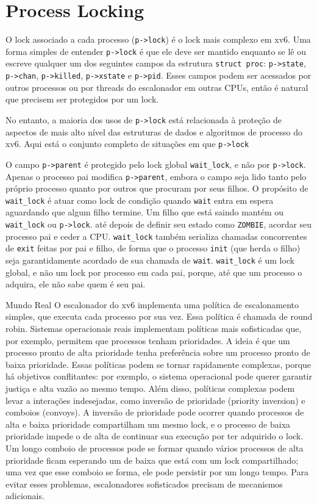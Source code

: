 {\section{Process Locking}
O lock associado a cada processo (\lstinline{p->lock}) é o
lock mais complexo em xv6.
Uma forma simples de entender \lstinline{p->lock} é
que ele deve ser mantido enquanto se lê ou escreve qualquer
um dos seguintes campos da estrutura \lstinline{struct proc}:
\lstinline{p->state},
\lstinline{p->chan},
\lstinline{p->killed},
\lstinline{p->xstate}
e
\lstinline{p->pid}.
Esses campos podem ser acessados por outros processos ou por
threads do escalonador em outras CPUs, então é natural
que precisem ser protegidos por um lock.

No entanto, a maioria dos usos de \lstinline{p->lock} está relacionada
à proteção de aspectos de mais alto nível das estruturas de dados
e algoritmos de processo do xv6. Aqui está o conjunto completo
de situações em que \lstinline{p->lock}

O campo \lstinline{p->parent} é protegido pelo lock global
\lstinline{wait_lock}, e não por \lstinline{p->lock}.
Apenas o processo pai modifica \lstinline{p->parent},
embora o campo seja lido tanto pelo próprio processo quanto por
outros que procuram por seus filhos.
O propósito de
\lstinline{wait_lock}
é atuar como lock de condição quando
\lstinline{wait}
entra em espera aguardando que algum filho termine.
Um filho que está saindo mantém ou \lstinline{wait_lock}
ou \lstinline{p->lock}.
até depois de definir seu estado como \lstinline{ZOMBIE}, acordar
seu processo pai e ceder a CPU. \lstinline{wait_lock} também
serializa chamadas concorrentes de \lstinline{exit} feitas por pai e filho,
de forma que o processo \lstinline{init} (que herda o filho) seja
garantidamente acordado de sua chamada de \lstinline{wait}.
\lstinline{wait_lock} é um lock global, e não um lock por processo em cada pai,
porque, até que um processo o adquira, ele não sabe quem é seu pai.

Mundo Real
O escalonador do xv6 implementa uma política de escalonamento simples,
que executa cada processo por sua vez. Essa política é chamada de
round robin.
Sistemas operacionais reais implementam políticas mais sofisticadas que, por exemplo,
permitem que processos tenham prioridades. A ideia é que um processo pronto de alta prioridade
tenha preferência sobre um processo pronto de baixa prioridade.
Essas políticas podem se tornar rapidamente complexas, porque há objetivos conflitantes:
por exemplo, o sistema operacional pode querer garantir justiça
e alta vazão ao mesmo tempo.
Além disso, políticas complexas podem levar a interações indesejadas, como
inversão de prioridade (priority inversion)
e
comboios (convoys).
A inversão de prioridade pode ocorrer quando processos de alta e baixa prioridade
compartilham um mesmo lock, e o processo de baixa prioridade impede o de alta
de continuar sua execução por ter adquirido o lock.
Um longo comboio de processos pode se formar quando vários processos de alta prioridade
ficam esperando um de baixa que está com um lock compartilhado; uma vez que esse comboio se forma,
ele pode persistir por um longo tempo.
Para evitar esses problemas, escalonadores sofisticados precisam de mecanismos adicionais.

}
